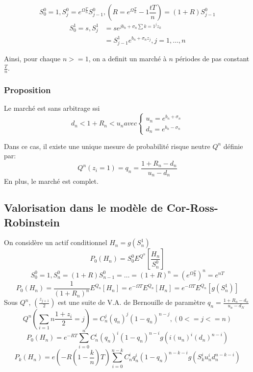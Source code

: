 \documentclass{article}
\begin{document}
\begin{equation}
S_0^0=1, S_j^0=e^{\Omega\frac{T}{n}}S_{j-1}^0,(R=e^{\Omega\frac{T}{n}}-1 \frac{tT}{n})=(1+R)S_{j-1}^0
\end{equation}
\begin{equation}
\begin{split}
S_0^1=s,S_j^1&=se^{jb_n+\sigma_n\sum{k=1}^j z_k}\\
&=S_{j-1}^1 e^{b_n+\sigma_n z_j}, j=1,\ldots,n
\end{split}
\end{equation}

Ainsi, pour chaque $n>=1$, on a definit un march\'e \`a $n$ p\'eriodes de pas constant $\frac{T}{n}$.

\subsubsection{Proposition}
Le march\'e est sans arbitrage ssi
\begin{equation}
d_n<1+R_n<u_n avec 
\left\{\begin{array}{rcl}
u_n=e^{b_n+\sigma_n}\\
d_n=e^{b_n-\sigma_n}
\end{array}\right.
\end{equation}

Dans ce cas, il existe une unique mesure de probabilit\'e risque neutre $Q^n$ d\'efinie par:
\begin{equation}
Q^n(z_i=1)=q_n=\frac{1+R_n-d_n}{u_n-d_n}
\end{equation}
En plus, le march\'e est complet.
\subsection{Valorisation dans le mod\`ele de Cor-Ross-Robinstein}
On consid\`ere un actif conditionnel $H_n=g(S_n^1)$
\begin{equation}
P_0(H_n)=S_0^0E^{Q^n}[\frac{H_n}{S_n^0}]
\end{equation}
\begin{equation}
S_0^0=1, S_n^0=(1+R)S_{n-1}^0=\ldots=(1+R)^n=(e^{\Omega\frac{T}{n}})^n=e^{nT}
\end{equation}
\begin{equation}
P_0(H_n)=\frac{1}{(1+R_n)^n}E^{Q_n}[H_n]=e^{-\Omega T}E^{Q_n}[H_n]=e^{-\Omega T}E^{Q_n}[g(S_n^1)]
\end{equation}
Sous $Q^n$, $(\frac{z_{j+1}}{2})$ est une suite de V.A. de Bernouille de param\`etre $q_n=\frac{1+R_n-d_n}{u_n-d_N}$
\begin{equation}
Q^n(\sum_{i=1}{n}\frac{1+z_i}{2}=j)=C_n^j(q_n)^j(1-q_n)^{n-j},(0<=j<=n)
\end{equation}
\begin{equation}
P_0(H_n)=e^{-RT}\sum_{i=0}^n C_n^i(q_n)^i(1-q_n)^{n-i}g(i(u_n)^i(d_n)^{n-i})
\end{equation}
\begin{equation}
P_k(H_n)=e(-R(1-\frac{k}{n})T)\sum_{i=0}^{n-k}C_n^iq_n^i(1-q_n)^{n-k-i}g(S_k^iu_n^id_n^{n-k-i})
\end{equation}
\end{document}
